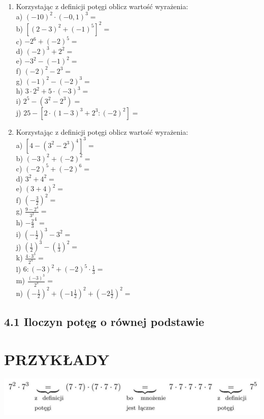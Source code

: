 \documentclass[10pt]{article}
\begin{document}
\begin{enumerate}
  \item Korzystając z definicji potęgi oblicz wartość wyrażenia:\\
a) \((-10)^{2} \cdot(-0,1)^{3}=\)\\
b) \(\left[(2-3)^{2}+(-1)^{5}\right]^{2}=\)\\
c) \(-2^{6}+(-2)^{5}=\)\\
d) \((-2)^{3}+2^{2}=\)\\
e) \(-3^{2}-(-1)^{2}=\)\\
f) \((-2)^{2}-2^{3}=\)\\
g) \((-1)^{2}-(-2)^{3}=\)\\
h) \(3 \cdot 2^{2}+5 \cdot(-3)^{3}=\)\\
i) \(2^{5}-\left(3^{2}-2^{3}\right)=\)\\
j) \(25-\left[2 \cdot(1-3)^{3}+2^{3}:(-2)^{2}\right]=\)
  \item Korzystając z definicji potęgi oblicz wartość wyrażenia:\\
a) \(\left[4-\left(3^{2}-2^{3}\right)^{4}\right]^{3}=\)\\
b) \((-3)^{2}+(-2)^{2}=\)\\
c) \((-2)^{5}+(-2)^{6}=\)\\
d) \(3^{2}+4^{2}=\)\\
e) \((3+4)^{2}=\)\\
f) \(\left(-\frac{3}{2}\right)^{2}=\)\\
g) \(\frac{9-2^{4}}{3^{2}}=\)\\
h) \(-\frac{2}{3}^{4}=\)\\
i) \(\left(-\frac{1}{2}\right)^{3}-3^{2}=\)\\
j) \(\left(\frac{1}{2}\right)^{3}-\left(\frac{1}{3}\right)^{2}=\)\\
k) \(\frac{4 \cdot 3^{3}}{2^{4}}=\)\\
l) \(6:(-3)^{2}+(-2)^{5} \cdot \frac{1}{3}=\)\\
m) \(\frac{(-3)^{3}}{2^{3}}=\)\\
n) \(\left(-\frac{1}{2}\right)^{2}+\left(-1 \frac{1}{2}\right)^{2}+\left(-2 \frac{1}{2}\right)^{2}=\)
\end{enumerate}

\subsection*{4.1 Iloczyn potęg o równej podstawie}
\section*{PRZYKŁADY}
\begin{center}
\includegraphics[max width=\textwidth]{2024_11_21_8f01584889ff06348ae7g-080}
\end{center}
\end{document}
